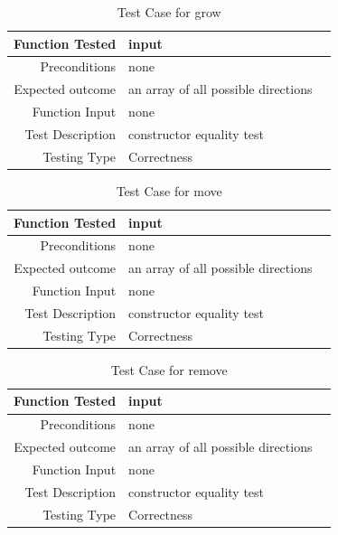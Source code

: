 \documentclass[12pt]{article}
\begin{document}
\begin{center}
	\begin{longtable}{ | r | p{4cm} | p{4cm} }
	\caption{Test Case for grow} \\ \hline \label{TblInputVar} 
	Function Tested & input\\ \hline
	Preconditions & none \\ \hline
	Expected outcome & an array of all possible directions \\ \hline
	Function Input & none \\ \hline
	Test Description & constructor equality test\\ \hline
	Testing Type & Correctness\\ \hline
	
	\end{longtable}
\end{center}

\begin{center}
	\begin{longtable}{ | r | p{4cm} | p{4cm} }
	\caption{Test Case for move} \\ \hline \label{TblInputVar} 
	Function Tested & input\\ \hline
	Preconditions & none \\ \hline
	Expected outcome & an array of all possible directions \\ \hline
	Function Input & none \\ \hline
	Test Description & constructor equality test\\ \hline
	Testing Type & Correctness\\ \hline
	
	\end{longtable}
\end{center}

\begin{center}
	\begin{longtable}{ | r | p{4cm} | p{4cm} }
	\caption{Test Case for remove} \\ \hline \label{TblInputVar} 
	Function Tested & input\\ \hline
	Preconditions & none \\ \hline
	Expected outcome & an array of all possible directions \\ \hline
	Function Input & none \\ \hline
	Test Description & constructor equality test\\ \hline
	Testing Type & Correctness\\ \hline
	
	\end{longtable}
\end{center}
\end{document}
